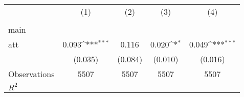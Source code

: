 {
\def\sym#1{\ifmmode^{#1}\else\(^{#1}\)\fi}
\begin{tabular}{l*{4}{c}}
\hline\hline
                    &\multicolumn{1}{c}{(1)}&\multicolumn{1}{c}{(2)}&\multicolumn{1}{c}{(3)}&\multicolumn{1}{c}{(4)}\\
                    &\multicolumn{1}{c}{} &\multicolumn{1}{c}{} &\multicolumn{1}{c}{} &\multicolumn{1}{c}{} \\
\hline
main                &                     &                     &                     &                     \\
att                 &       0.093\sym{***}&       0.116         &       0.020\sym{*}  &       0.049\sym{***}\\
                    &     (0.035)         &     (0.084)         &     (0.010)         &     (0.016)         \\
\hline
Observations        &        5507         &        5507         &        5507         &        5507         \\
\(R^{2}\)           &                     &                     &                     &                     \\
\hline\hline
\end{tabular}
}
